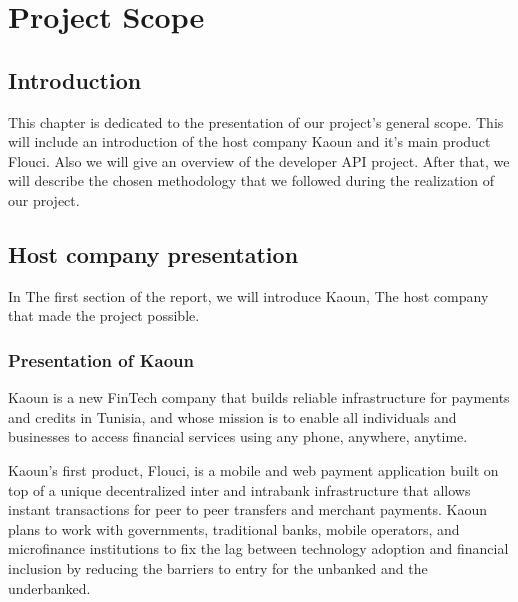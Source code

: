 \setcounter{mtc}{4} %
\chapter{Project Scope}
\minitoc  %

\graphicspath{{Chapitre1/figures/}}
\pagestyle{fancy}
\fancyhf{}
\fancyhead[R]{\bfseries\rightmark}
\fancyfoot[R]{\thepage}
\renewcommand{\headrulewidth}{0.5pt}
\renewcommand{\footrulewidth}{0pt}
\renewcommand{\chaptermark}[1]{\markboth{\MakeUppercase{\chaptername~\thechapter. #1 }}{}}
\renewcommand{\sectionmark}[1]{\markright{\thechapter.\thesection~ #1}}

\begin{spacing}{1.2}

\section*{Introduction}
This chapter is dedicated to the presentation of our project's general scope. 
This will include an introduction of the host company Kaoun and it's main product Flouci. Also we will give an overview of the developer API project. After that, we will describe the chosen methodology that we followed during the realization of our project.
\section{Host company presentation} 
In The first section of the report, we will introduce Kaoun, The host company that made the project possible.
\subsection{Presentation of Kaoun}
Kaoun is a new FinTech company that builds reliable infrastructure for payments and credits in Tunisia, and whose mission is to enable all individuals and businesses to access financial services using any phone, anywhere, anytime. 

Kaoun's first product, Flouci, is a mobile and web payment application built on top of a unique decentralized inter and intrabank infrastructure that allows instant transactions for peer to peer transfers and merchant payments. Kaoun plans to work with governments, traditional banks, mobile operators, and microfinance institutions to fix the lag between technology adoption and financial inclusion by reducing the barriers to entry for the unbanked and the underbanked.



\end{spacing}
